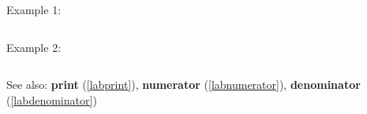 \noindent Example 1: 
\begin{center}\begin{minipage}{15cm}\begin{Verbatim}[frame=single]
\end{Verbatim}
\end{minipage}\end{center}
\noindent Example 2: 
\begin{center}\begin{minipage}{15cm}\begin{Verbatim}[frame=single]
\end{Verbatim}
\end{minipage}\end{center}
See also: \textbf{print} (\ref{labprint}), \textbf{numerator} (\ref{labnumerator}), \textbf{denominator} (\ref{labdenominator})
